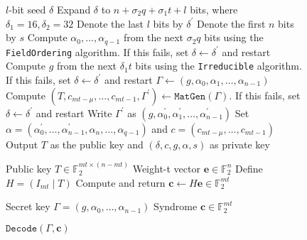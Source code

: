 \documentclass[runningheads]{llncs}
\begin{document}
\begin{figure}[hp]
\begin{algorithm}[H]
    \caption{$\texttt{SeededKeyGen}(\delta)$}\label{alg:mceliece-seeded-keygen}
    \begin{algorithmic}[1]
        \Require $l$-bit seed $\delta$
        \State Expand $\delta$ to $n + \sigma_2 q + \sigma_1 t + l$ bits, where $\delta_1 = 16, \delta_2 = 32$
        \State Denote the last $l$ bits by $\delta^\prime$
        \State Denote the first $n$ bits by $s$
        \State Compute $\alpha_0, \ldots, \alpha_{q-1}$ from the next $\sigma_2 q$ bits using the \texttt{FieldOrdering} algorithm. If this fails, set $\delta \leftarrow \delta^\prime$ and restart
        \State Compute $g$ from the next $\delta_1 t$ bits using the \texttt{Irreducible} algorithm. If this fails, set $\delta \leftarrow \delta^\prime$ and restart
        \State $\Gamma \leftarrow (g, \alpha_0, \alpha_1, \ldots, \alpha_{n-1})$
        \State Compute $(T, c_{mt-\mu}, \ldots, c_{mt-1}, \Gamma^\prime) \leftarrow \texttt{MatGen}(\Gamma)$. If this fails, set $\delta \leftarrow \delta^\prime$ and restart
        \State Write $\Gamma^\prime$ as $(g, \alpha_0^\prime, \alpha_1^\prime, \ldots, \alpha_{n-1}^\prime)$
        \State Set $\alpha = (\alpha_0^\prime, \ldots, \alpha_{n-1}^\prime, \alpha_n, \ldots, \alpha_{q-1})$ and $c = (c_{mt-\mu}, \ldots, c_{mt-1})$
        \State Output $T$ as the public key and $(\delta, c, g, \alpha, s)$ as private key
    \end{algorithmic}
\end{algorithm}
\vspace{-4em}
\begin{algorithm}[H]
    \caption{$\texttt{Encode}(T, \mathbf{e})$}\label{alg:mceliece-encode}
    \begin{algorithmic}[1]
        \Require Public key $T\in\mathbb{F}_2^{mt \times (n - mt)}$
        \Require Weight-t vector $\mathbf{e}\in\mathbb{F}_2^n$
        \State Define $H = (I_{mt} \mid T)$
        \State Compute and return $\mathbf{c} \leftarrow H\mathbf{e} \in \mathbb{F}_2^{mt}$
    \end{algorithmic}
\end{algorithm}
\vspace{-4em}
\begin{algorithm}[H]
    \caption{$\texttt{Decode}(\Gamma, \mathbf{c})$}\label{alg:mceliece-decode}
    \begin{algorithmic}[1]
        \Require Secret key $\Gamma = (g, \alpha_0, \ldots, \alpha_{n-1})$
        \Require Syndrome $\mathbf{c}\in\mathbb{F}_2^{mt}$

\end{algorithmic}
\end{algorithm}
\end{figure}
\end{document}
